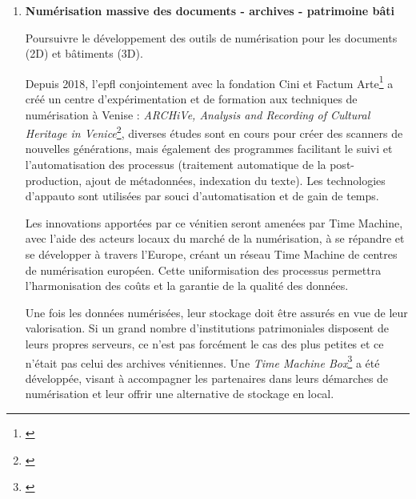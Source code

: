 \begin{enumerate}
\item \textbf{Numérisation massive des documents - archives - patrimoine bâti} 

Poursuivre le développement des outils de numérisation pour les documents (2D) et bâtiments (3D). 

Depuis 2018, l'\gls{epfl} conjointement avec la fondation Cini et Factum Arte\footnote{\cite{s.l_factum_nodate}} a créé un centre d'expérimentation et de formation aux techniques de numérisation à Venise : \textit{ARCHiVe, Analysis and Recording of Cultural Heritage in Venice}\footnote{\cite{noauthor_archive_nodate}}, diverses études sont en cours pour créer des scanners de nouvelles générations, mais également des programmes facilitant le suivi et l'automatisation des processus (traitement automatique de la post-production, ajout de métadonnées, indexation du texte). Les technologies d'\gls{appauto} sont utilisées par souci d'automatisation et de gain de temps. 

Les innovations apportées par ce  vénitien seront amenées par Time Machine, avec l'aide des acteurs locaux du marché de la numérisation, à se répandre et se développer à travers l'Europe, créant un réseau Time Machine de centres de numérisation européen. Cette uniformisation des processus permettra l'harmonisation des coûts et la garantie de la qualité des données. 

Une fois les données numérisées, leur stockage doit être assurés en vue de leur valorisation. Si un grand nombre d'institutions patrimoniales disposent de leurs propres serveurs, ce n'est pas forcément le cas des plus petites et ce n'était pas celui des archives vénitiennes. Une \textit{Time Machine Box}\footnote{\cite{epfl.dhlab_home_nodate}} a été développée, visant à accompagner les partenaires dans leurs démarches de numérisation et leur offrir une alternative de stockage en local.


\end{enumerate}
